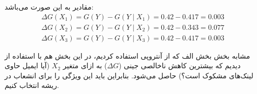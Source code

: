 \begin{ابجد}
مقادیر  به این صورت می‌باشد:
\begin{align*}
    \Delta G(X_1) = G(Y) - G(Y \mid X_1) = 0.42 - 0.417 = 0.003 \\
    \Delta G(X_2) = G(Y) - G(Y \mid X_2) = 0.42 - 0.343 = 0.077 \\
    \Delta G(X_3) = G(Y) - G(Y \mid X_3) = 0.42 - 0.417 = 0.003
\end{align*}

مشابه بخش بخش الف که از آنتروپی استفاده کردیم، در این بخش هم با استفاده از  دیدیم که بیشترین کاهش ناخالصی جینی ($\Delta G$) به ازای متغیر $X_2$ (آیا ایمیل حاوی لینک‌های مشکوک است؟) حاصل می‌شود. بنابراین باید این ویژگی را برای انشعاب در ریشه انتخاب کنیم.

\end{ابجد}
